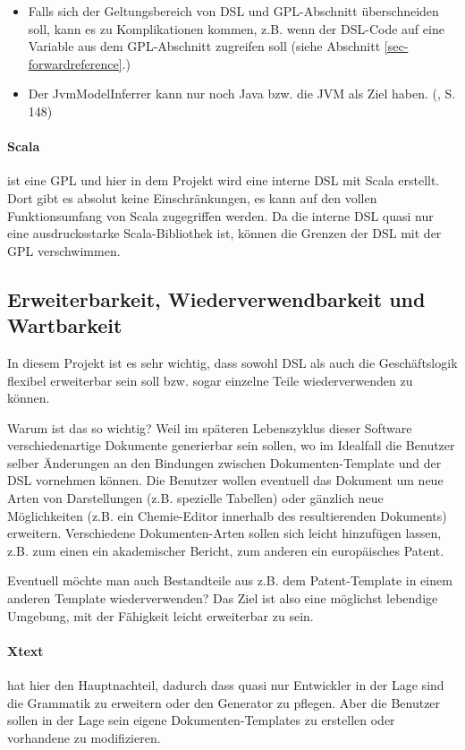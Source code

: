 \begin{itemize}
  \item Falls sich der Geltungsbereich von DSL und GPL-Abschnitt überschneiden
        soll, kann es zu Komplikationen kommen, z.B. wenn der DSL-Code
        auf eine Variable aus dem GPL-Abschnitt zugreifen soll (siehe
        Abschnitt \ref{sec-forwardreference}.)
  \item Der JvmModelInferrer kann nur noch Java bzw. die JVM als Ziel haben.
        (\cite{xtext}, S. 148)
\end{itemize}

\paragraph{Scala} ist eine GPL und hier in dem Projekt wird eine interne
DSL mit Scala erstellt. Dort gibt es absolut keine Einschränkungen, es
kann auf den vollen Funktionsumfang von Scala zugegriffen werden.
Da die interne DSL quasi nur eine ausdrucksstarke Scala-Bibliothek ist,
können die Grenzen der DSL mit der GPL verschwimmen.


\subsection{Erweiterbarkeit, Wiederverwendbarkeit und Wartbarkeit}
\label{sec-erweiterbar}

In diesem Projekt ist es sehr wichtig, dass sowohl DSL als auch
die Geschäftslogik flexibel erweiterbar sein soll bzw. sogar
einzelne Teile wiederverwenden zu können.

Warum ist das so wichtig? Weil im späteren Lebenszyklus dieser Software
verschiedenartige Dokumente generierbar sein sollen, wo im Idealfall
die Benutzer selber Änderungen an den Bindungen zwischen
Dokumenten-Template und der DSL vornehmen können. Die Benutzer
wollen eventuell das Dokument um neue Arten von Darstellungen (z.B. spezielle
Tabellen) oder gänzlich neue Möglichkeiten (z.B. ein Chemie-Editor
innerhalb des resultierenden Dokuments) erweitern.
Verschiedene Dokumenten-Arten sollen sich leicht hinzufügen lassen,
z.B. zum einen ein akademischer Bericht, zum anderen ein europäisches Patent.

Eventuell möchte man auch Bestandteile aus z.B. dem Patent-Template in
einem anderen Template wiederverwenden? Das Ziel ist also eine
möglichst lebendige Umgebung, mit der Fähigkeit leicht erweiterbar zu sein.

\paragraph{Xtext} hat hier den Hauptnachteil, dadurch dass quasi nur
Entwickler in der Lage sind die Grammatik zu erweitern oder den
Generator zu pflegen. Aber die Benutzer sollen in der Lage sein
eigene Dokumenten-Templates zu erstellen oder vorhandene zu modifizieren.

